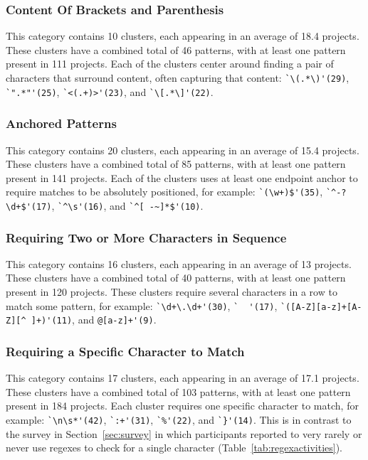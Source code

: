 \subsubsection{Content Of Brackets and Parenthesis}
This category contains 10 clusters, each appearing in an average of 18.4 projects.  These clusters have a combined total of 46 patterns, with at least one pattern present in 111 projects. Each of the clusters center around finding a pair of characters that surround content, often capturing that content:
\verb!`\(.*\)'(29)!, \verb!`".*"'(25)!, \verb!`<(.+)>'(23)!, and \verb!`\[.*\]'(22)!.

\subsubsection{Anchored Patterns}
This category contains 20 clusters, each appearing in an average of 15.4 projects.  These clusters have a combined total of 85 patterns, with at least one pattern present in 141 projects. Each of the clusters uses at least one endpoint anchor to require matches to be absolutely positioned, for example:
\verb!`(\w+)$'(35)!, \verb!`^-?\d+$'(17)!, \verb!`^\s'(16)!, and \verb!`^[ -~]*$'(10)!.

\subsubsection{Requiring Two or More Characters in Sequence}
This category contains 16 clusters, each appearing in an average of 13 projects.  These clusters have a combined total of 40 patterns, with at least one pattern present in 120 projects. These clusters require several characters in a row to match some pattern, for example:
\verb!`\d+\.\d+'(30)!, \verb!`  '(17)!, \verb!`([A-Z][a-z]+[A-Z][^ ]+)'(11)!, and \verb!@[a-z]+'(9)!.

\subsubsection{Requiring a Specific Character to Match}
This category contains 17 clusters, each appearing in an average of 17.1 projects.  These clusters have a combined total of 103 patterns, with at least one pattern present in 184 projects. Each cluster requires one specific character to match, for example:
\verb!`\n\s*'(42)!, \verb!`:+'(31)!, \verb!`%'(22)!, and \verb!`}'(14)!.  This is in contrast to the survey in Section~\ref{sec:survey} in which participants reported to very rarely or never use regexes to check for a single character (Table~\ref{tab:regexactivities}).

